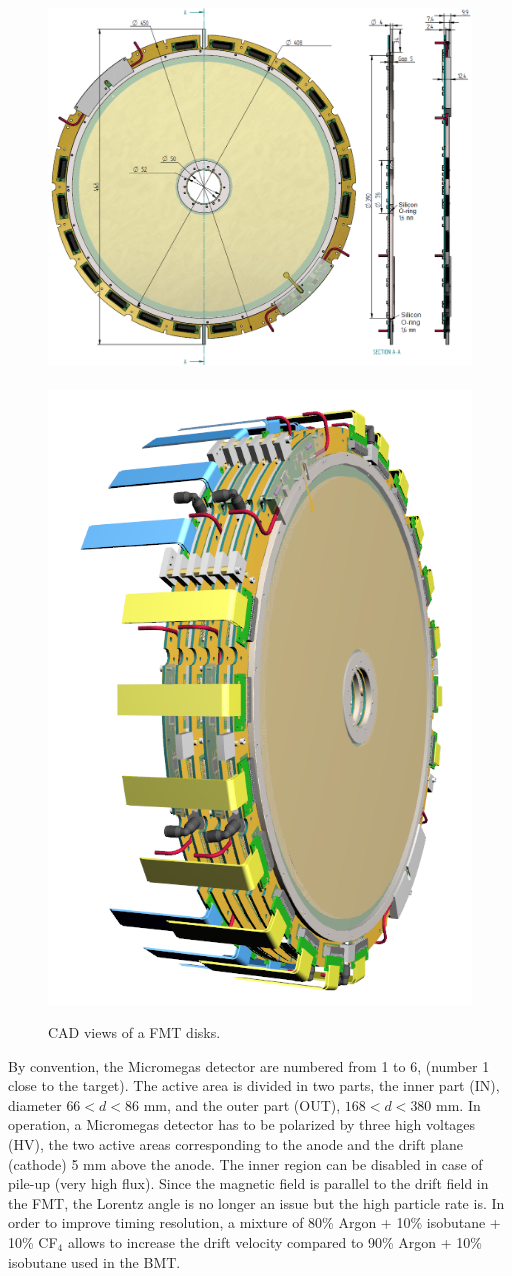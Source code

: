 \begin{figure}[htb]
 
\includegraphics[width=0.66\columnwidth,keepaspectratio]{images/fig6_1}~\includegraphics[width=0.33\columnwidth,
keepaspectratio]{images/fig6_2}
 \caption{CAD views of a FMT disks.}
 \label{fig:mm-fig5}
\end{figure}

By convention, the Micromegas detector are numbered from 1 to 6, (number 1 close to the target). The active area is divided in two parts, the inner part (IN),  diameter  $66 < d < 86$ mm, and the outer part (OUT), $168 < d < 380$ mm. 
In operation, a Micromegas detector has to be polarized by three high voltages (HV), the two active areas corresponding to the anode and the drift plane (cathode) 5 mm above the anode. The inner region can be disabled in case of pile-up (very high flux). Since the magnetic field is parallel to the drift field in the FMT, the Lorentz angle is no longer an issue but the high particle rate is. In order to improve timing resolution, a mixture of 80\% Argon + 10\% isobutane + 10\% CF$_4$ allows to increase the drift velocity compared to 90\% Argon + 10\% isobutane used in the BMT. 


